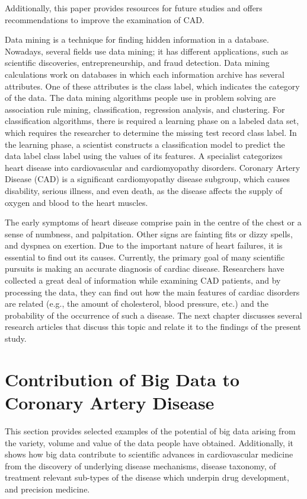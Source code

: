 Additionally, this paper provides resources for future studies and
offers recommendations to improve the examination of CAD. 
\par Data mining is a technique for finding hidden information in a
database. Nowadays, several fields use data mining; it has different
applications, such as scientific discoveries, entrepreneurship, and
fraud detection. Data mining calculations work on databases in which
each information archive has several attributes. One of these
attributes is the class label, which indicates the  category of the data.  
The data mining algorithms people use in problem solving are
association rule mining, classification, regression analysis,  and
clustering. 
For classification algorithms, there is required a learning phase on a
labeled data set, which requires the researcher to  determine the
missing test record class label. 
In the learning phase, a scientist constructs a classification model
to predict the data label class label using the values  of its features.
A specialist categorizes heart disease into cardiovascular and
cardiomyopathy disorders. 
Coronary Artery Disease (CAD) is a significant cardiomyopathy disease
subgroup, which causes disability, serious illness, and even death, as
the disease affects the supply of oxygen and blood to the heart
muscles. 
\par The early symptoms of heart disease comprise pain in the centre
of the chest or a sense of numbness, and palpitation. Other signs are
fainting fits or dizzy spells, and dyspnea on exertion. Due to the
important nature of heart failures, it is essential to find out its
causes. Currently, the primary goal of many scientific pursuits is
making an accurate diagnosis of cardiac disease. Researchers have
collected a great deal of information while examining CAD patients,
and by processing the data, they can find out how the main features of
cardiac disorders are related (e.g., the amount of cholesterol, blood
pressure, etc.) and the probability of the occurrence of such a
disease. The next chapter discusses several research articles that
discuss this topic and relate it to the findings of the present study.


\section{Contribution of Big Data to Coronary Artery Disease}

This section provides selected examples of the potential of big data
arising from the variety, volume and value of the data people have
obtained. 
Additionally, it shows how big data contribute to scientific advances  
in cardiovascular medicine from the discovery of  underlying disease
mechanisms, disease taxonomy, of treatment relevant  sub-types of the
disease which underpin drug development, and precision  medicine.

